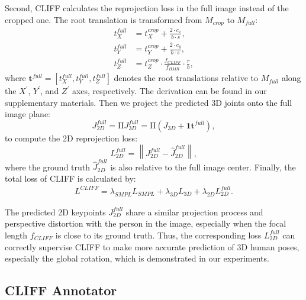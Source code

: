 \documentclass[runningheads]{llncs}
\begin{document}
Second, CLIFF calculates the reprojection loss in the full image instead of the cropped one.
The root translation is transformed from $M_{crop}$ to $M_{full}$:
\begin{equation}\begin{aligned}
	\label{eq:convert_full}
	t_X^{full} & = t_X^{crop} + \frac{2 \cdot c_x}{b \cdot s}, \\
	t_Y^{full} & = t_Y^{crop} + \frac{2 \cdot c_y}{b \cdot s}, \\
	t_Z^{full} & = t_Z^{crop} \cdot \frac{f_{CLIFF}}{f_{HMR}} \cdot \frac{r}{b},
\end{aligned}\end{equation}
where $\mathbf{t}^{full}=[t^{full}_X, t^{full}_Y, t^{full}_Z]$ denotes the root translations relative to $M_{full}$ along the $X^{'}$, $Y^{'}$, and $Z^{'}$ axes, respectively. The derivation can be found in our supplementary materials.
Then we project the predicted 3D joints onto the full image plane:
\begin{equation}
	J_{2D}^{full} = \mathrm{\Pi} J_{3D}^{full}
			      = \mathrm{\Pi} (J_{3D} + \mathbf{1} \mathbf{t}^{full}),
\end{equation}
to compute the 2D reprojection loss:
\begin{equation}
	L_{2D}^{full} = \left \| J_{2D}^{full} - \hat{J}_{2D}^{full} \right \|,
\end{equation}
where the ground truth $\hat{J}_{2D}^{full}$ is also relative to the full image center.
Finally, the total loss of CLIFF is calculated by:
\begin{equation}\begin{aligned}
	L^{CLIFF} = \lambda_{SMPL}L_{SMPL}+\lambda_{3D}L_{3D}+\lambda_{2D}L_{2D}^{full}.
\end{aligned}\end{equation}

The predicted 2D keypoints $J_{2D}^{full}$ share a similar projection process and perspective distortion with the person in the image, especially when the focal length $f_{CLIFF}$ is close to its ground truth. Thus, the corresponding loss $L_{2D}^{full}$ can correctly supervise CLIFF to make more accurate prediction of 3D human poses, especially the global rotation, which is demonstrated in our experiments.

\subsection{CLIFF Annotator}\label{sec:anno}
\end{document}
